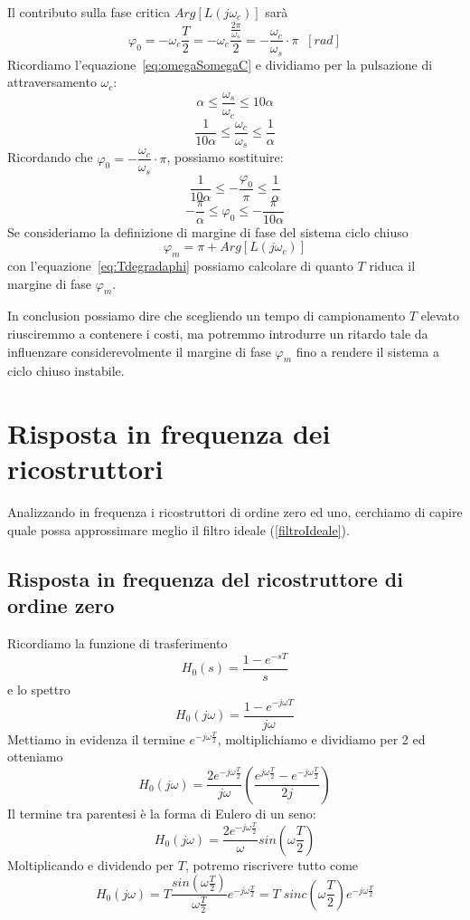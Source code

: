 \documentclass[a4paper]{report}
\begin{document}
Il contributo sulla fase critica $Arg[L(j \omega_c)]$ sar\`a
\[
\varphi_0 = - \omega_c \dfrac{T}{2} = - \omega_c \dfrac{\frac{2
    \pi}{\omega_s}}{2} = - \dfrac{\omega_c}{\omega_s}\cdot \pi
\;\;[rad]
\]
Ricordiamo l'equazione~\ref{eq:omegaSomegaC} e dividiamo per la
pulsazione di attraversamento $\omega_c$:
\[
\alpha \leq \dfrac{\omega_s}{\omega_c} \leq 10 \alpha
\]
\[
\dfrac{1}{10 \alpha} \leq \dfrac{\omega_c}{\omega_s} \leq
\dfrac{1}{\alpha} 
\]
Ricordando che $\varphi_0 = - \dfrac{\omega_c}{\omega_s}\cdot \pi$,
possiamo sostituire:
\[
\dfrac{1}{10 \alpha} \leq -\dfrac{\varphi_0}{\pi} \leq
\dfrac{1}{\alpha}
\]
\begin{equation}\label{Tdegradaphi}
  - \dfrac{\pi}{\alpha} \leq \varphi_0 \leq -\dfrac{\pi}{10\alpha}
\end{equation}
Se consideriamo la definizione di margine di fase del sistema ciclo
chiuso
\[
\varphi_m = \pi + Arg[L(j \omega_c)]
\]
con l'equazione~\ref{eq:Tdegradaphi} possiamo calcolare di quanto $T$
riduca il margine di fase $\varphi_m$.

In conclusion possiamo dire che scegliendo un tempo di campionamento
$T$ elevato riusciremmo a contenere i costi, ma potremmo introdurre un
ritardo tale da influenzare considerevolmente il margine di fase
$\varphi_m$ fino a rendere il sistema a ciclo chiuso instabile.

\section{Risposta in frequenza dei ricostruttori}
Analizzando in frequenza i ricostruttori di ordine zero ed uno,
cerchiamo di capire quale possa approssimare meglio il filtro ideale
(\ref{filtroIdeale}).

\subsection{Risposta in frequenza del ricostruttore di ordine zero}
Ricordiamo la funzione di trasferimento
\[
H_0(s) = \dfrac{1 - e^{-sT}}{s}
\]
e lo spettro
\[
H_0(j \omega) = \dfrac{1 - e^{-j \omega T}}{j \omega}
\]
Mettiamo in evidenza il termine $e^{-j \omega \frac{T}{2}}$,
moltiplichiamo e dividiamo per 2 ed otteniamo
\[
H_0(j \omega) = \dfrac{2e^{-j \omega \frac{T}{2}}}{j \omega} \left(
\dfrac{e^{j \omega \frac{T}{2}} - e^{-j \omega \frac{T}{2}}}{2j}\right)
\]
Il termine tra parentesi \`e la forma di Eulero di un seno:
\[
H_0(j \omega) = \dfrac{2e^{-j \omega \frac{T}{2}}}{\omega} sin
\left(\omega \dfrac{T}{2} \right)
\]
Moltiplicando e dividendo per $T$, potremo riscrivere tutto come
\[
H_0(j \omega) = T \dfrac{sin \left(\omega \frac{T}{2} \right)}{\omega
\frac{T}{2}} e^{-j \omega \frac{T}{2}} = T\;sinc \left(\omega
\dfrac{T}{2} \right) e^{-j \omega \frac{T}{2}}
\]
\end{document}
